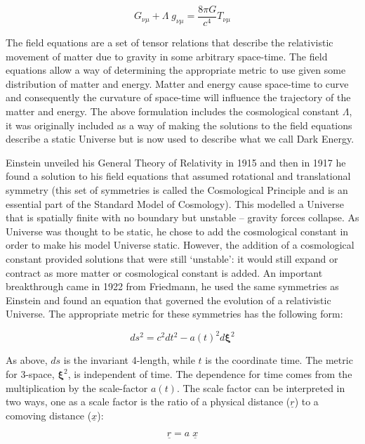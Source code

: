 \begin{equation}
\label{eqn_efe}
G_{\nu\mu} + \Lambda \; g_{\nu\mu} = \frac{8\pi G}{c^4}T_{\nu\mu}
\end{equation}

\noindent The field equations are a set of tensor relations that describe the relativistic movement of matter due to gravity in some arbitrary space-time. The field equations allow a way of determining the appropriate metric to use given some distribution of matter and energy. Matter and energy cause space-time to curve and consequently the curvature of space-time will influence the trajectory of the matter and energy. The above formulation includes the cosmological constant $\Lambda$, it was originally included as a way of making the solutions to the field equations describe a static Universe but is now used to describe what we call Dark Energy.

Einstein unveiled his General Theory of Relativity in 1915 and then in 1917 he found a solution to his field equations that assumed rotational and translational symmetry (this set of symmetries is called the Cosmological Principle and is an essential part of the Standard Model of Cosmology). This modelled a Universe that is spatially finite with no boundary but unstable -- gravity forces collapse. As Universe was thought to be static, he chose to add the cosmological constant in order to make his model Universe static. However, the addition of a cosmological constant provided solutions that were still `unstable': it would still expand or contract as more matter or cosmological constant is added. An important breakthrough came in 1922 from Friedmann, he used the same symmetries as Einstein and found an equation that governed the evolution of a relativistic Universe. The appropriate metric for these symmetries has the following form:

\begin{equation}
\label{eqn_metric}
ds^2 = c ^2 dt^2 - a(t)^2 d\mathbf{\xi}^2
\end{equation}

\noindent As above, $ds$ is the invariant 4-length, while $t$ is the coordinate time. The metric for 3-space, $\mathbf{\xi}^2$, is independent of time. The dependence for time comes from the multiplication by the scale-factor $a(t)$. The scale factor can be interpreted in two ways, one as a scale factor is the ratio of a physical distance ($\underline {r}$) to a comoving distance ($\underline {x}$):

\begin{equation}
\label{eqn_scalefact}
\underline {r} = a \; \underline {x}
\end{equation}

